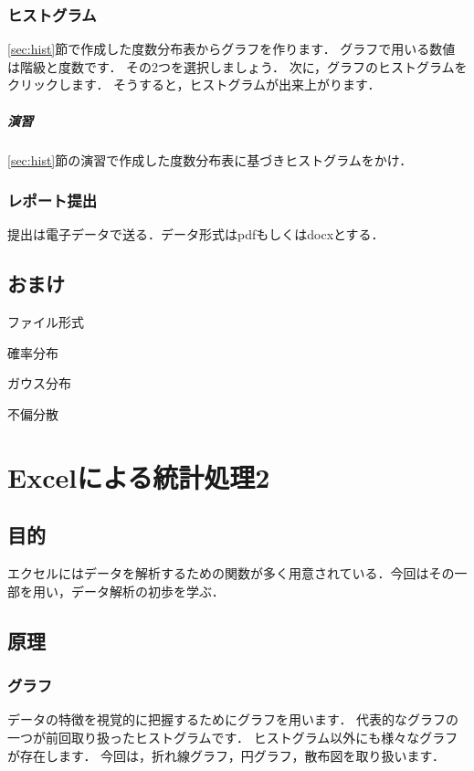 \documentclass[12pt, a4j]{jreport}
\begin{document}
\subsection{ヒストグラム}

\ref{sec:hist}節で作成した度数分布表からグラフを作ります．
グラフで用いる数値は階級と度数です．
その2つを選択しましょう．
次に，グラフのヒストグラムをクリックします．
そうすると，ヒストグラムが出来上がります．

\paragraph{演習}

\ref{sec:hist}節の演習で作成した度数分布表に基づきヒストグラムをかけ．


\subsection{レポート提出}

提出は電子データで送る．データ形式はpdfもしくはdocxとする．

\section{おまけ}

ファイル形式

確率分布

ガウス分布

不偏分散


\chapter{Excelによる統計処理2}

\section{目的}

エクセルにはデータを解析するための関数が多く用意されている．今回はその一部を用い，データ解析の初歩を学ぶ．

\section{原理}

\subsection{グラフ}

データの特徴を視覚的に把握するためにグラフを用います．
代表的なグラフの一つが前回取り扱ったヒストグラムです．
ヒストグラム以外にも様々なグラフが存在します．
今回は，折れ線グラフ，円グラフ，散布図を取り扱います．
\end{document}
